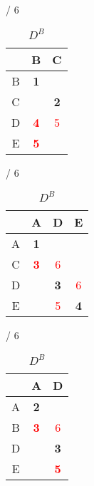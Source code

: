 \documentclass[a4paper, 11 pt, article, accentcolor=tud7b]{tudreport}
\begin{document}
	\begin{table}[h]
	  \begin{subtable}[b]{\textwidth / 6}
	    \begin{tabular}{| c | c | c |}
	      \hline
	        & B                           & C                  \\ \hline
	      B & \textbf{1}                  &                    \\ \hline
	      C &                             & \textbf{2}         \\ \hline
	      D & \textbf{\textcolor{red}{4}} & \textcolor{red}{5} \\ \hline
	      E & \textbf{\textcolor{red}{5}} &                    \\ \hline
	    \end{tabular}
	    \caption{$D^{A}$}
	  \end{subtable}
	  \hfill
	  \begin{subtable}[b]{\textwidth / 6}
	    \begin{tabular}{| c | c | c | c |}
	    \hline
	      & A                           & D                  & E                  \\ \hline
	    A & \textbf{1}                  &                    &                    \\ \hline
	    C & \textbf{\textcolor{red}{3}} & \textcolor{red}{6} &                    \\ \hline
	    D &                             & \textbf{3}         & \textcolor{red}{6} \\ \hline
	    E &                             & \textcolor{red}{5} & \textbf{4}         \\ \hline
	    \end{tabular}
	    \caption{$D^{B}$}
	  \end{subtable}
	  \hfill
	  \begin{subtable}[b]{\textwidth / 6}
	    \begin{tabular}{| c | c | c |}
	    \hline
	      & A                           & D                           \\ \hline
	    A & \textbf{2}                  &                             \\ \hline
	    B & \textbf{\textcolor{red}{3}} & \textcolor{red}{6}          \\ \hline
	    D &                             & \textbf{3}                  \\ \hline
	    E &                             & \textbf{\textcolor{red}{5}} \\ \hline

\end{tabular}
\end{subtable}
\end{table}
\end{document}
